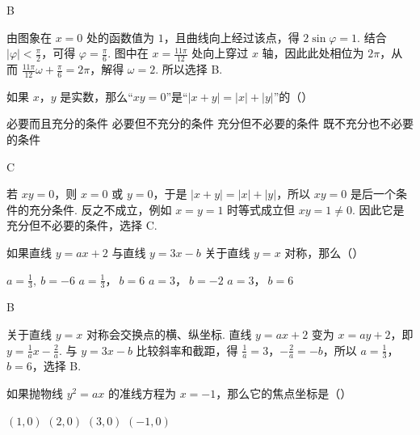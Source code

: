 \documentclass[UTF8,a4paper,oneside,11pt]{ctexbook}
\begin{document}
\begin{answer}
B
\end{answer}

\begin{solution}
由图象在 \(x=0\) 处的函数值为 \(1\)，且曲线向上经过该点，得 \(2\sin\varphi=1\). 结合 \(\left|\varphi\right|<\frac{\pi}{2}\)，可得 \(\varphi=\frac{\pi}{6}\). 图中在 \(x=\frac{11\pi}{12}\) 处向上穿过 \(x\) 轴，因此此处相位为 \(2\pi\)，从而 \(\frac{11\pi}{12}\omega+\frac{\pi}{6}=2\pi\)，解得 \(\omega=2\). 所以选择 B.
\end{solution}

\begin{problem}
如果 \(x\)，\(y\) 是实数，那么“\(xy=0\)”是“\(\left|x+y\right|=\left|x\right|+\left|y\right|\)”的（\quad）

\choices
    {必要而且充分的条件}
    {必要但不充分的条件}
    {充分但不必要的条件}
    {既不充分也不必要的条件}
\end{problem}

\begin{answer}
C
\end{answer}

\begin{solution}
若 \(xy=0\)，则 \(x=0\) 或 \(y=0\)，于是 \(\left|x+y\right|=\left|x\right|+\left|y\right|\)，所以 \(xy=0\) 是后一个条件的充分条件. 反之不成立，例如 \(x=y=1\) 时等式成立但 \(xy=1\ne0\). 因此它是充分但不必要的条件，选择 C.
\end{solution}

\begin{problem}
如果直线 \(y=ax+2\) 与直线 \(y=3x-b\) 关于直线 \(y=x\) 对称，那么（\quad）

\choices
    {\(a=\frac{1}{3},\ b=-6\)}
    {\(a=\frac{1}{3}\)，\(\ b=6\)}
    {\(a=3\)，\(\ b=-2\)}
    {\(a=3\)，\(\ b=6\)}
\end{problem}

\begin{answer}
B
\end{answer}

\begin{solution}
关于直线 \(y=x\) 对称会交换点的横、纵坐标. 直线 \(y=ax+2\) 变为 \(x=ay+2\)，即 \(y=\frac{1}{a}x-\frac{2}{a}\). 与 \(y=3x-b\) 比较斜率和截距，得 \(\frac1a=3\)，\(-\frac2a=-b\)，所以 \(a=\frac13\)，\(b=6\)，选择 B.
\end{solution}

\begin{problem}
如果抛物线 \(y^2=ax\) 的准线方程为 \(x=-1\)，那么它的焦点坐标是（\quad）

\choices
    {\((1,0)\)}
    {\((2,0)\)}
    {\((3,0)\)}
    {\((-1,0)\)}
\end{problem}
\end{document}
